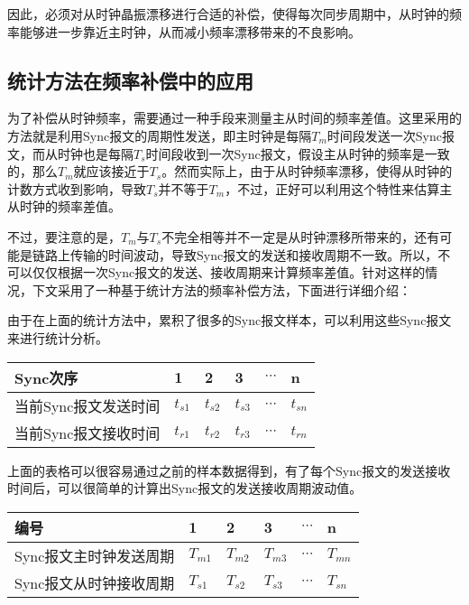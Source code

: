 因此，必须对从时钟晶振漂移进行合适的补偿，使得每次同步周期中，从时钟的频率能够进一步靠近主时钟，从而减小频率漂移带来的不良影响。

\subsection{统计方法在频率补偿中的应用}
为了补偿从时钟频率，需要通过一种手段来测量主从时间的频率差值。这里采用的方法就是利用Sync报文的周期性发送，即主时钟是每隔$T_{m}$时间段发送一次Sync报文，而从时钟也是每隔$T_{s}$时间段收到一次Sync报文，假设主从时钟的频率是一致的，那么$T_{m}$就应该接近于$T_{s}$。然而实际上，由于从时钟频率漂移，使得从时钟的计数方式收到影响，导致$T_{s}$并不等于$T_{m}$，不过，正好可以利用这个特性来估算主从时钟的频率差值。

不过，要注意的是，$T_{m}$与$T_{s}$不完全相等并不一定是从时钟漂移所带来的，还有可能是链路上传输的时间波动，导致Sync报文的发送和接收周期不一致。所以，不可以仅仅根据一次Sync报文的发送、接收周期来计算频率差值。针对这样的情况，下文采用了一种基于统计方法的频率补偿方法，下面进行详细介绍：

由于在上面的统计方法中，累积了很多的Sync报文样本，可以利用这些Sync报文来进行统计分析。
\begin{table}[htpb]
  \centering
  \begin{tabular}{llllll} \toprule
    Sync次序 & 1 & 2 & 3 & $\cdots$ & n \\ \midrule
    当前Sync报文发送时间 & $t_{s1}$ & $t_{s2}$ & $t_{s3}$ & $\cdots$ & $t_{sn}$ \\ \midrule
    当前Sync报文接收时间 & $t_{r1}$ & $t_{r2}$ & $t_{r3}$ & $\cdots$ & $t_{rn}$  \\ \bottomrule
  \end{tabular}
\end{table}

上面的表格可以很容易通过之前的样本数据得到，有了每个Sync报文的发送接收时间后，可以很简单的计算出Sync报文的发送接收周期波动值。
\begin{table}[htpb]
  \centering
  \begin{tabular}{llllll} \toprule
    编号 & 1 & 2 & 3 & $\cdots$ & n \\ \midrule
    Sync报文主时钟发送周期 & $T_{m1}$ & $T_{m2}$ & $T_{m3}$ & $\cdots$ & $T_{mn}$ \\ \midrule
    Sync报文从时钟接收周期 & $T_{s1}$ & $T_{s2}$ & $T_{s3}$ & $\cdots$ & $T_{sn}$  \\ \bottomrule
  \end{tabular}
\end{table}


